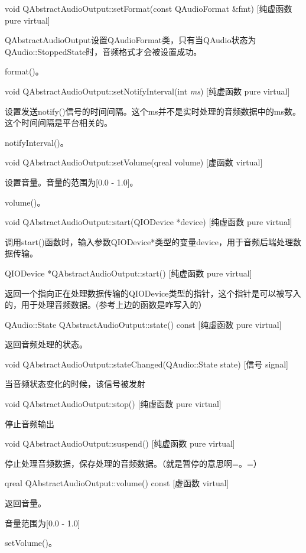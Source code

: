 void QAbstractAudioOutput::setFormat(const QAudioFormat \&fmt) [纯虚函数 pure virtual] 

QAbstractAudioOutput设置QAudioFormat类，只有当QAudio状态为QAudio::StoppedState时，音频格式才会被设置成功。

\begin{notice}[另请参阅]
format()。
\end{notice}

void QAbstractAudioOutput::setNotifyInterval(int \emph{ms}) [纯虚函数 pure virtual] 

设置发送notify()信号的时间间隔。这个ms并不是实时处理的音频数据中的ms数。
这个时间间隔是平台相关的。

\begin{notice}[另请参阅]
notifyInterval()。
\end{notice}

void QAbstractAudioOutput::setVolume(qreal volume) [虚函数 virtual] 

设置音量。音量的范围为[0.0 - 1.0]。 

\begin{notice}[另请参阅]
volume()。
\end{notice}

void QAbstractAudioOutput::start(QIODevice *device) [纯虚函数 pure virtual] 

调用start()函数时，输入参数QIODevice*类型的变量device，用于音频后端处理数据传输。

QIODevice *QAbstractAudioOutput::start() [纯虚函数 pure virtual] 

返回一个指向正在处理数据传输的QIODevice类型的指针，这个指针是可以被写入的，用于处理音频数据。(参考上边的函数是咋写入的）

QAudio::State QAbstractAudioOutput::state() const [纯虚函数 pure
virtual] 

返回音频处理的状态。

void QAbstractAudioOutput::stateChanged(QAudio::State state) [信号
signal] 

当音频状态变化的时候，该信号被发射

void QAbstractAudioOutput::stop() [纯虚函数 pure virtual] 

停止音频输出

void QAbstractAudioOutput::suspend() [纯虚函数 pure virtual] 

停止处理音频数据，保存处理的音频数据。（就是暂停的意思啊=。=）

qreal QAbstractAudioOutput::volume() const [虚函数 virtual] 

返回音量。

音量范围为[0.0 - 1.0] 

\begin{notice}[另请参阅]
setVolume()。
\end{notice}
